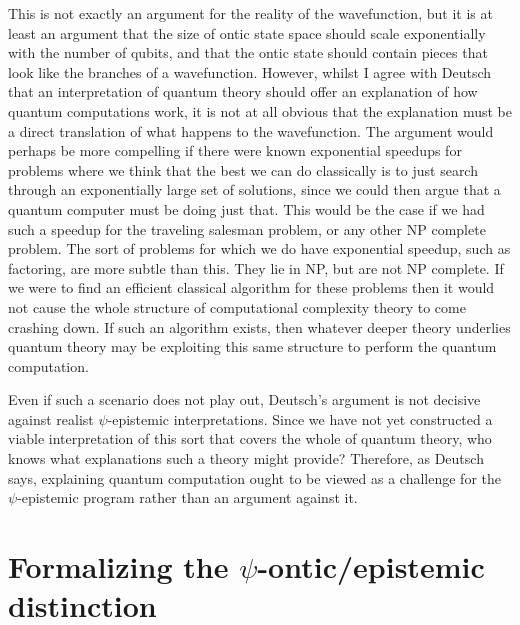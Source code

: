 \documentclass[DIV=calc,fontsize=12pt]{scrartcl} %
\theoremstyle{definition}
\theoremstyle{plain}
\begin{document}
This is not exactly an argument for the reality of the wavefunction,
but it is at least an argument that the size of ontic state space
should scale exponentially with the number of qubits, and that the
ontic state should contain pieces that look like the branches of a
wavefunction.  However, whilst I agree with Deutsch that an
interpretation of quantum theory should offer an explanation of how
quantum computations work, it is not at all obvious that the
explanation must be a direct translation of what happens to the
wavefunction.  The argument would perhaps be more compelling if there
were known exponential speedups for problems where we think that the
best we can do classically is to just search through an exponentially
large set of solutions, since we could then argue that a quantum
computer must be doing just that.  This would be the case if we had
such a speedup for the traveling salesman problem, or any other NP
complete problem.  The sort of problems for which we do have
exponential speedup, such as factoring, are more subtle than this.
They lie in NP, but are not NP complete.  If we were to find an
efficient classical algorithm for these problems then it would not
cause the whole structure of computational complexity theory to come
crashing down.  If such an algorithm exists, then whatever deeper
theory underlies quantum theory may be exploiting this same structure
to perform the quantum computation.

Even if such a scenario does not play out, Deutsch's argument is not
decisive against realist $\psi$-epistemic interpretations.  Since we
have not yet constructed a viable interpretation of this sort that
covers the whole of quantum theory, who knows what explanations such a
theory might provide?  Therefore, as Deutsch says, explaining quantum
computation ought to be viewed as a challenge for the $\psi$-epistemic
program rather than an argument against it.

\section{Formalizing the $\psi$-ontic/epistemic distinction}

\label{Form}
\end{document}
